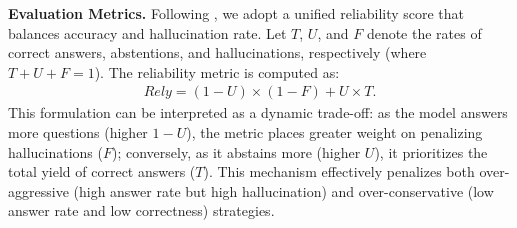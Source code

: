 \documentclass{article} %
\begin{document}
\noindent
\textbf{Evaluation Metrics.}
Following \citet{Rejection_Improves_Reliability}, 
we adopt a unified reliability score that balances accuracy and hallucination rate.
Let $T$, $U$, and $F$ denote the rates of correct answers, abstentions, and hallucinations, respectively (where $T+U+F=1$). 
The reliability metric is computed as: 
\begin{align*}
    Rely = (1-U) \times (1-F) + U \times T.
\end{align*}
This formulation can be interpreted as a dynamic trade-off: as the model answers more questions (higher $1-U$), the metric places greater weight on penalizing hallucinations ($F$); conversely, as it abstains more (higher $U$), it prioritizes the total yield of correct answers ($T$). This mechanism effectively penalizes both over-aggressive (high answer rate but high hallucination) and over-conservative (low answer rate and low correctness) strategies.
\end{document}
